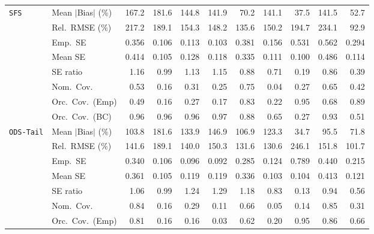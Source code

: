 \begin{landscape}
\begin{longtable}{llrrrrrrrrr}
\addlinespace[2pt]
\quad \texttt{SFS} & Mean $|$Bias$|$ (\%) & 167.2 & 181.6 & 144.8 & 141.9 & \cellcolor{rankthree}70.2 & 141.1 & \cellcolor{rankone}37.5 & 141.5 & \cellcolor{ranktwo}52.7 \\
 & Rel.\ RMSE (\%) & 217.2 & 189.1 & 154.3 & \cellcolor{rankthree}148.2 & \cellcolor{ranktwo}135.6 & 150.2 & 194.7 & 234.1 & \cellcolor{rankone}92.9 \\
 & Emp.\ SE & 0.356 & 0.106 & 0.113 & 0.103 & 0.381 & 0.156 & 0.531 & 0.562 & 0.294 \\
 & Mean SE & 0.414 & 0.105 & 0.128 & 0.118 & 0.335 & 0.111 & 0.100 & 0.486 & 0.114 \\
 & SE ratio & 1.16 & \cellcolor{rankone}0.99 & \cellcolor{rankthree}1.13 & 1.15 & \cellcolor{ranktwo}0.88 & 0.71 & 0.19 & 0.86 & 0.39 \\
 & Nom.\ Cov. & \cellcolor{rankthree}0.53 & 0.16 & 0.31 & 0.25 & \cellcolor{rankone}0.75 & 0.04 & 0.27 & \cellcolor{ranktwo}0.65 & 0.42 \\
 & Orc.\ Cov.\ (Emp) & 0.49 & 0.16 & 0.27 & 0.17 & \cellcolor{rankthree}0.83 & 0.22 & \cellcolor{rankone}0.95 & 0.68 & \cellcolor{ranktwo}0.89 \\
 & Orc.\ Cov.\ (BC) & \cellcolor{rankone}0.96 & \cellcolor{rankone}0.96 & \cellcolor{rankone}0.96 & \cellcolor{ranktwo}0.97 & \cellcolor{rankthree}0.88 & 0.65 & 0.27 & \cellcolor{ranktwo}0.93 & 0.51 \\
\addlinespace[2pt]
\quad \texttt{ODS-Tail} & Mean $|$Bias$|$ (\%) & 103.8 & 181.6 & 133.9 & 146.9 & 106.9 & 123.3 & \cellcolor{rankone}34.7 & \cellcolor{rankthree}95.5 & \cellcolor{ranktwo}71.8 \\
 & Rel.\ RMSE (\%) & 141.6 & 189.1 & 140.0 & 150.3 & \cellcolor{rankthree}131.6 & \cellcolor{ranktwo}130.6 & 246.1 & 151.8 & \cellcolor{rankone}101.7 \\
 & Emp.\ SE & 0.340 & 0.106 & 0.096 & 0.092 & 0.285 & 0.124 & 0.789 & 0.440 & 0.215 \\
 & Mean SE & 0.361 & 0.105 & 0.119 & 0.119 & 0.336 & 0.103 & 0.104 & 0.413 & 0.121 \\
 & SE ratio & \cellcolor{ranktwo}1.06 & \cellcolor{rankone}0.99 & 1.24 & 1.29 & 1.18 & \cellcolor{rankthree}0.83 & 0.13 & \cellcolor{ranktwo}0.94 & 0.56 \\
 & Nom.\ Cov. & \cellcolor{ranktwo}0.84 & 0.16 & 0.29 & 0.11 & \cellcolor{rankthree}0.66 & 0.05 & 0.14 & \cellcolor{rankone}0.85 & 0.31 \\
 & Orc.\ Cov.\ (Emp) & \cellcolor{rankthree}0.81 & 0.16 & 0.16 & 0.03 & 0.62 & 0.20 & \cellcolor{rankone}0.95 & \cellcolor{ranktwo}0.86 & 0.66 \\

\end{longtable}
\end{landscape}

